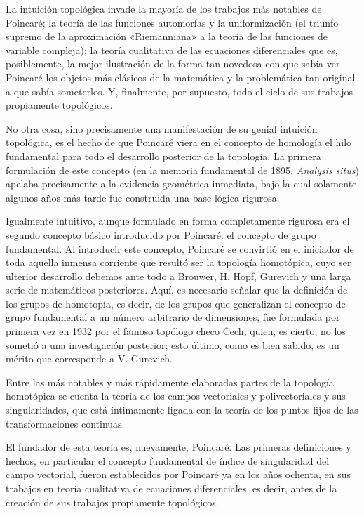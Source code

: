 \documentclass[a4paper, 12pt]{article}
\begin{document}
La intuición topológica invade la mayoría de  los trabajos más notables de Poincaré; la teoría de  las funciones automorfas y la uniformización (el triunfo supremo de la aproximación «Riemanniana» a la teoría de las funciones de variable compleja); la teoría cualitativa de las ecuaciones diferenciales que es,  posiblemente, la mejor ilustración de la forma tan novedosa con que sabía ver Poincaré los objetos más clásicos de la matemática y la problemática tan original a que sabía someterlos. Y, finalmente, por supuesto,
todo el ciclo de sus trabajos propiamente topológicos.

No otra cosa, sino precisamente una manifestación de su genial intuición topológica, es el hecho  de que Poincaré viera en el concepto de homología el hilo fundamental para todo el desarrollo posterior de la topología. La primera formulación de este concepto (en la memoria fundamental de 1895, {\it Analysis situs}) apelaba precisamente a la evidencia geométrica inmediata, bajo la cual solamente algunos años más tarde fue construida una base lógica rigurosa.

Igualmente intuitivo, aunque formulado en forma completamente rigurosa era el segundo concepto básico introducido por Poincaré: el concepto de grupo  fundamental. Al introducir este concepto, Poincaré se convirtió en el iniciador de toda aquella inmensa corriente que resultó ser la topología homotópica, cuyo	ser ulterior desarrollo debemos ante todo a Brouwer, H.  Hopf, Gurevich y una larga serie de matemáticos posteriores. Aquí, es necesario señalar que la definición de los grupos de homotopía, es decir, de los grupos  que generalizan el concepto de grupo fundamental a un
número arbitrario de dimensiones, fue formulada por  primera vez en 1932 por el famoso topólogo checo \v{C}ech, quien, es cierto, no los sometió a una investigación  posterior; esto último, como es bien sabido, es un mérito que corresponde a V. Gurevich.  

Entre las más notables y más rápidamente elaboradas partes de la topología homotópica se cuenta la  teoría de los campos vectoriales y polivectoriales y  sus singularidades, que está íntimamente ligada con la teoría de los puntos fijos de las transformaciones continuas.

El fundador de esta teoría es, nuevamente, Poincaré. Las primeras definiciones y hechos, en particular el concepto fundamental de índice de singularidad del campo vectorial, fueron establecidos por Poincaré ya  en los años ochenta, en sus trabajos en teoría cualitativa de ecuaciones diferenciales, es decir, antes de  la creación de sus trabajos propiamente topológicos.
\end{document}

